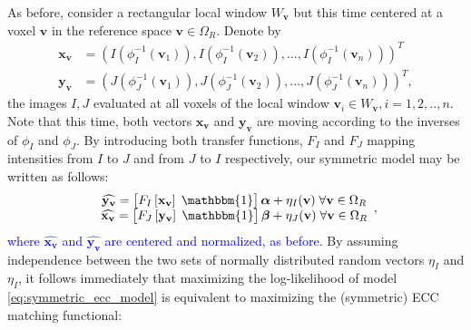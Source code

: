 
As before, consider a rectangular local window $W_{\mathbf{v}}$ but this time centered at a voxel $\mathbf{v}$ in the reference space $\mathbf{v}\in\Omega_{R}$. Denote by
\begin{align*}
    \mathbf{x}_{\mathbf{v}} &= \left(I(\phi_{I}^{-1}(\mathbf{v}_{1})), I(\phi_{I}^{-1}(\mathbf{v}_{2})), ..., I(\phi_{I}^{-1}(\mathbf{v}_{n}))\right)^{T}\\
    \mathbf{y}_{\mathbf{v}} &= \left(J(\phi_{J}^{-1}(\mathbf{v}_{1})), J(\phi_{J}^{-1}(\mathbf{v}_{2})), ..., J(\phi_{J}^{-1}(\mathbf{v}_{n}))\right)^{T},
\end{align*}
the images $I, J$ evaluated at all voxels of the local window $\mathbf{v}_{i}\in W_{\mathbf{v}}, i=1, 2, .., n$. Note that this time, both vectors $\mathbf{x}_{\mathbf{v}}$ and $\mathbf{y}_{\mathbf{v}}$ are moving according to the inverses of $\phi_{I}$ and $\phi_{J}$. By introducing both transfer functions, $F_{I}$ and $F_{J}$ mapping intensities from $I$ to $J$ and from $J$ to $I$ respectively, our symmetric model may be written as follows:
\begin{equation}\label{eq:symmetric_ecc_model}
    \begin{array}{ccccc}
        \widehat{\mathbf{y_v}} = \left[F_{I}\left[\mathbf{x}_{\mathbf{v}}\right] \; \mathbbm{1}\right]\boldsymbol{\alpha} + \eta_{I}(\mathbf{v}) \; \forall \mathbf{v}\in\Omega_{R}\\
        \widehat{\mathbf{x_v}} = \left[F_{J}\left[\mathbf{y}_{\mathbf{v}}\right] \; \mathbbm{1}\right]\boldsymbol{\beta} + \eta_{J}(\mathbf{v}) \; \forall \mathbf{v}\in\Omega_{R}\\
    \end{array},
\end{equation}
\textcolor{blue}{where $\widehat{\mathbf{x_v}}$ and $\widehat{\mathbf{y_v}}$ are centered and normalized, as before}. By assuming independence between the two sets of normally distributed random vectors $\eta_{I}$ and $\eta_{I}$, it follows immediately that maximizing the log-likelihood of model \eqref{eq:symmetric_ecc_model} is equivalent to maximizing the (symmetric) ECC matching functional:
